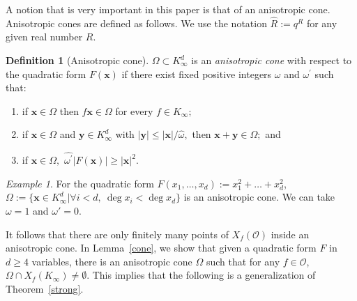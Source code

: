 \documentclass[10pt]{amsart}
\theoremstyle{plain}
\theoremstyle{plain}
\renewcommand{\vec}[1]{\mathbf{#1}}
\theoremstyle{remark}
\newtheorem{remark}[equation]{Remark}
\newtheorem{example}[theorem]{Example}
\theoremstyle{definition}
\newtheorem{definition}[theorem]{Definition}
\renewcommand{\hat}{\widehat}
\newcommand{\Ki}{K_\infty}
\begin{document}
 A notion that is very important in this paper is that of an anisotropic cone. 
  Anisotropic cones are defined as follows. We use the notation $\hat{R}:=q^R$ for any given real number $R$.
\begin{definition}[Anisotropic cone]\label{def:aniso}
$\Omega\subset K_{\infty}^d$ is an \textit{anisotropic cone} with respect to the quadratic form $F(\vec{x})$ if there exist fixed positive integers $\omega$  and  $\omega^{\prime}$ such that: 
\begin{enumerate}
\item if $\vec{x}\in \Omega$ then $f\vec{x}\in \Omega$ for every $f\in K_\infty;$
\item \label{prop2} if $\vec{x}\in\Omega$ and $\vec{y} \in  K_\infty^d $ with $|\vec{y}|\leq |\vec{x}|/ \hat{\omega},$ then $\vec{x}+\vec{y} \in \Omega;$ and 
\item \label{prop3}  if $\vec{x}\in\Omega,$  $ \hat{\omega^{\prime}} |F(\vec{x})| \geq |\vec{x}|^2.$
\end{enumerate}
\end{definition}
\begin{example}\label{exampleaniso}
For the quadratic form $F(x_1,\hdots,x_d):=x_1^2+\dots+x_d^2$, $\Omega:=\{\vec{x}\in\Ki^d|\forall i<d,\ \deg x_i<\deg x_d\}$ is an anisotropic cone. We can take $\omega=1$ and $\omega'=0$.
\end{example}
It follows that there are only finitely many points of $X_f(\mathcal{O})$ inside an anisotropic cone. In Lemma~\ref{cone}, we show that given a quadratic form $F$ in $d\geq 4$ variables, there is an anisotropic cone $\Omega$ such that for any $f\in\mathcal{O}$, $\Omega\cap X_f(\Ki)\neq\emptyset$. This implies that the following is a generalization of Theorem~\ref{strong}.
\end{document}
